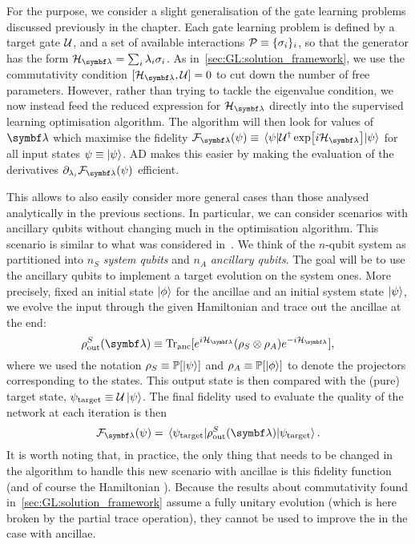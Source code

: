 For the purpose, we consider a slight generalisation of the gate learning problems discussed previously in the chapter. Each gate learning problem is defined by a target gate ${\mathcal{U}}$, and a set of available interactions ${\mathcal{P}}\equiv \{\sigma_i\}_i$, so that the \ansatz generator has the form $\calH_\bslambda=\sum_i \lambda_i \sigma_i$. As in~\cref{sec:GL:solution_framework}, we use the commutativity condition $[\calH_\bslambda,\calU]=0$ to cut down the number of free parameters. However, rather than trying to tackle the eigenvalue condition, we now instead feed the reduced expression for $\calH_\bslambda$ directly into the supervised learning optimisation algorithm. The algorithm will then look for values of $\bslambda$ which maximise the fidelity $\calF_\bslambda(\psi)\equiv\mel{\psi}{\calU^\dagger \exp[i\calH_\bslambda]}{\psi}$ for all input states $\psi\equiv\ket\psi$.
AD makes this easier by making the evaluation of the derivatives $\partial_{\lambda_i}\calF_\bslambda(\psi)$ efficient.

This allows to also easily consider more general cases than those analysed analytically in the previous sections. In particular, we can consider scenarios with ancillary qubits without changing much in the optimisation algorithm.
This scenario is similar to what was considered in~\cite{banchi2016quantum}.
We think of the $n$-qubit system as partitioned into $n_S$ \emph{system qubits} and $n_A$ \emph{ancillary qubits}. The goal will be to use the ancillary qubits to implement a target evolution on the system ones. More precisely, fixed an initial state $\ket\phi$ for the ancillae and an initial system state $\ket\psi$, we evolve the input through the given Hamiltonian and trace out the ancillae at the end:
\begin{equation}
    \rho_{\on{out}}^S(\bslambda) \equiv \Tr_{\on{anc}}[e^{i\calH_\bslambda}(\rho_S\otimes\rho_A)e^{-i\calH_\bslambda}],
\end{equation}
where we used the notation $\rho_S\equiv{\mathbb{P}}[\ket\psi]$ and $\rho_A\equiv{\mathbb{P}}[\ket\phi]$ to denote the projectors corresponding to the states. This output state is then compared with the (pure) target state, $\psi_{\operatorname{target}}\equiv{\mathcal{U}}\ket\psi$. The final fidelity used to evaluate the quality of the network at each iteration is then
\begin{equation}
    \calF_\bslambda(\psi) = \mel{\psi_{\on{target}}}{\rho^S_{\on{out}}(\bslambda)}{\psi_{\on{target}}}.
    \label{eq:GL:fidelity_map_vs_unitary}
\end{equation}
It is worth noting that, in practice, the only thing that needs to be changed in the algorithm to handle this new scenario with ancillae is this fidelity function (and of course the Hamiltonian \ansatz).
Because the results about commutativity found in~\cref{sec:GL:solution_framework} assume a fully unitary evolution (which is here broken by the partial trace operation), they cannot be used to improve the \ansatz in the case with ancillae.

